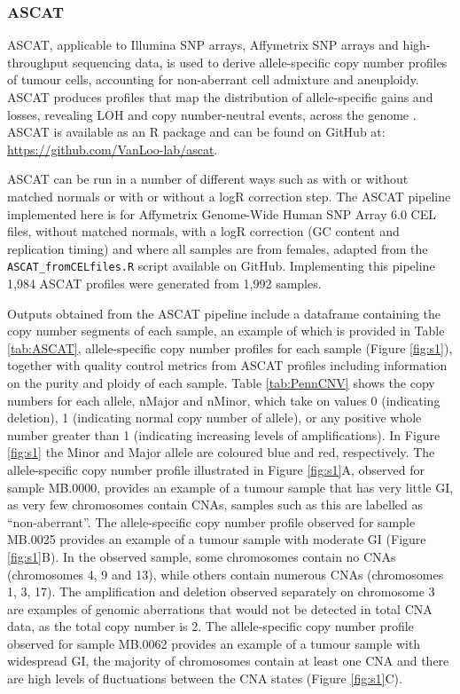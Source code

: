 \subsubsection{ASCAT}
ASCAT, applicable to Illumina SNP arrays, Affymetrix SNP arrays and high-throughput sequencing data, is used to derive allele-specific copy number profiles of tumour cells, accounting for non-aberrant cell admixture and aneuploidy. ASCAT produces profiles that map the distribution of allele-specific gains and losses, revealing LOH and copy number-neutral events, across the genome \citep{pmid20837533}. ASCAT is available as an R package and can be found on GitHub at: \href{https://github.com/VanLoo-lab/ascat}{https://github.com/VanLoo-lab/ascat}.  

ASCAT can be run in a number of different ways such as with or without matched normals or with or without a logR correction step. The ASCAT pipeline implemented here is for Affymetrix Genome-Wide Human SNP Array 6.0 CEL files, without matched normals, with a logR correction (GC content and replication timing) and where all samples are from females, adapted from the \texttt{ASCAT\_fromCELfiles.R} script available on GitHub. Implementing this pipeline 1,984 ASCAT profiles were generated from 1,992 samples. 

Outputs obtained from the ASCAT pipeline include a dataframe containing the copy number segments of each sample, an example of which is provided in Table \ref{tab:ASCAT}, allele-specific copy number profiles for each sample (Figure \ref{fig:s1}), together with quality control metrics from ASCAT profiles including information on the purity and ploidy of each sample. Table \ref{tab:PennCNV} shows the copy numbers for each allele, nMajor and nMinor, which take on values 0 (indicating deletion), 1 (indicating normal copy number of allele), or any positive whole number greater than 1 (indicating increasing levels of amplifications). In Figure \ref{fig:s1} the Minor and Major allele are coloured blue and red, respectively. The allele-specific copy number profile illustrated in Figure \ref{fig:s1}A, observed for sample MB.0000, provides an example of a tumour sample that has very little GI, as very few chromosomes contain CNAs, samples such as this are labelled as “non-aberrant”. The allele-specific copy number profile observed for sample MB.0025 provides an example of a tumour sample with moderate GI (Figure \ref{fig:s1}B). In the observed sample, some chromosomes contain no CNAs (chromosomes 4, 9 and 13), while others contain numerous CNAs (chromosomes 1, 3, 17). The amplification and deletion observed separately on chromosome 3 are examples of genomic aberrations that would not be detected in total CNA data, as the total copy number is 2. The allele-specific copy number profile observed for sample MB.0062 provides an example of a tumour sample with widespread GI, the majority of chromosomes contain at least one CNA and there are high levels of fluctuations between the CNA states (Figure \ref{fig:s1}C).

